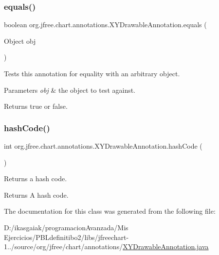 \subsubsection{\texorpdfstring{equals()}{equals()}}
{\footnotesize\ttfamily boolean org.\+jfree.\+chart.\+annotations.\+X\+Y\+Drawable\+Annotation.\+equals (\begin{DoxyParamCaption}\item[{Object}]{obj }\end{DoxyParamCaption})}

Tests this annotation for equality with an arbitrary object.


\begin{DoxyParams}{Parameters}
{\em obj} & the object to test against.\\
\hline
\end{DoxyParams}
\begin{DoxyReturn}{Returns}
{\ttfamily true} or {\ttfamily false}. 
\end{DoxyReturn}
\mbox{\label{classorg_1_1jfree_1_1chart_1_1annotations_1_1_x_y_drawable_annotation_a5dd0f7b338180abf4b29449807e39528}} 
\subsubsection{\texorpdfstring{hash\+Code()}{hashCode()}}
{\footnotesize\ttfamily int org.\+jfree.\+chart.\+annotations.\+X\+Y\+Drawable\+Annotation.\+hash\+Code (\begin{DoxyParamCaption}{ }\end{DoxyParamCaption})}

Returns a hash code.

\begin{DoxyReturn}{Returns}
A hash code. 
\end{DoxyReturn}


The documentation for this class was generated from the following file\+:\begin{DoxyCompactItemize}
\item 
D\+:/ikasgaiak/programacion\+Avanzada/\+Mis Ejercicios/\+P\+B\+Ldefinitibo2/libs/jfreechart-\/1../source/org/jfree/chart/annotations/\mbox{\hyperlink{_x_y_drawable_annotation_8java}{X\+Y\+Drawable\+Annotation.\+java}}\end{DoxyCompactItemize}
